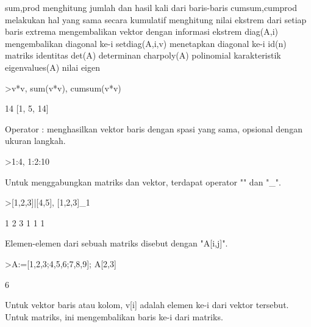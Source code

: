 \documentclass[a4paper,10pt]{article}
\begin{document}
\begin{eulernotebook}
\begin{eulercomment}
\begin{eulercomment}
\begin{eulercomment}
\begin{eulercomment}
\begin{eulercomment}
\begin{eulercomment}
\begin{eulercomment}
\end{eulercomment}
\begin{eulerttcomment}
  sum,prod menghitung jumlah dan hasil kali dari baris-baris
  cumsum,cumprod melakukan hal yang sama secara kumulatif
  menghitung nilai ekstrem dari setiap baris
  extrema mengembalikan vektor dengan informasi ekstrem
  diag(A,i) mengembalikan diagonal ke-i
  setdiag(A,i,v) menetapkan diagonal ke-i
  id(n) matriks identitas
  det(A) determinan
  charpoly(A) polinomial karakteristik
  eigenvalues(A) nilai eigen
\end{eulerttcomment}
\begin{eulerprompt}
>v*v, sum(v*v), cumsum(v*v)
\end{eulerprompt}
\begin{euleroutput}
  [1,  4,  9]
  14
  [1,  5,  14]
\end{euleroutput}
\begin{eulercomment}
Operator : menghasilkan vektor baris dengan spasi yang sama, opsional
dengan ukuran langkah.
\end{eulercomment}
\begin{eulerprompt}
>1:4, 1:2:10
\end{eulerprompt}
\begin{euleroutput}
  [1,  2,  3,  4]
  [1,  3,  5,  7,  9]
\end{euleroutput}
\begin{eulercomment}
Untuk menggabungkan matriks dan vektor, terdapat operator "\textbar{}" dan "\_".
\end{eulercomment}
\begin{eulerprompt}
>[1,2,3]|[4,5], [1,2,3]_1
\end{eulerprompt}
\begin{euleroutput}
  [1,  2,  3,  4,  5]
              1             2             3 
              1             1             1 
\end{euleroutput}
\begin{eulercomment}
Elemen-elemen dari sebuah matriks disebut dengan "A[i,j]".
\end{eulercomment}
\begin{eulerprompt}
>A:=[1,2,3;4,5,6;7,8,9]; A[2,3]
\end{eulerprompt}
\begin{euleroutput}
  6
\end{euleroutput}
\begin{eulercomment}
Untuk vektor baris atau kolom, v[i] adalah elemen ke-i dari vektor
tersebut. Untuk matriks, ini mengembalikan baris ke-i dari matriks.

\end{eulercomment}
\end{eulercomment}
\end{eulercomment}
\end{eulercomment}
\end{eulercomment}
\end{eulercomment}
\end{eulercomment}
\end{eulernotebook}
\end{document}
